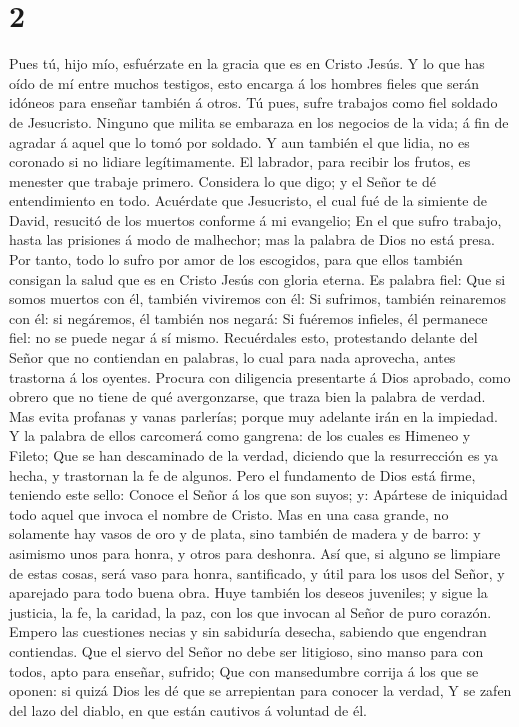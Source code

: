 \hypertarget{section-1}{%
\section{2}\label{section-1}}

 Pues tú, hijo mío, esfuérzate en la gracia que es en
Cristo Jesús.  Y lo que has oído de mí entre muchos
testigos, esto encarga á los hombres fieles que serán idóneos para
enseñar también á otros.  Tú pues, sufre trabajos como
fiel soldado de Jesucristo.  Ninguno que milita se
embaraza en los negocios de la vida; á fin de agradar á aquel que lo
tomó por soldado.  Y aun también el que lidia, no es
coronado si no lidiare legítimamente.  El labrador, para
recibir los frutos, es menester que trabaje primero. 
Considera lo que digo; y el Señor te dé entendimiento en todo.
 Acuérdate que Jesucristo, el cual fué de la simiente de
David, resucitó de los muertos conforme á mi evangelio; 
En el que sufro trabajo, hasta las prisiones á modo de malhechor; mas la
palabra de Dios no está presa.  Por tanto, todo lo sufro
por amor de los escogidos, para que ellos también consigan la salud que
es en Cristo Jesús con gloria eterna.  Es palabra fiel:
Que si somos muertos con él, también viviremos con él: 
Si sufrimos, también reinaremos con él: si negáremos, él también nos
negará:  Si fuéremos infieles, él permanece fiel: no se
puede negar á sí mismo.  Recuérdales esto, protestando
delante del Señor que no contiendan en palabras, lo cual para nada
aprovecha, antes trastorna á los oyentes.  Procura con
diligencia presentarte á Dios aprobado, como obrero que no tiene de qué
avergonzarse, que traza bien la palabra de verdad.  Mas
evita profanas y vanas parlerías; porque muy adelante irán en la
impiedad.  Y la palabra de ellos carcomerá como gangrena:
de los cuales es Himeneo y Fileto;  Que se han
descaminado de la verdad, diciendo que la resurrección es ya hecha, y
trastornan la fe de algunos.  Pero el fundamento de Dios
está firme, teniendo este sello: Conoce el Señor á los que son suyos; y:
Apártese de iniquidad todo aquel que invoca el nombre de Cristo.
 Mas en una casa grande, no solamente hay vasos de oro y
de plata, sino también de madera y de barro: y asimismo unos para honra,
y otros para deshonra.  Así que, si alguno se limpiare de
estas cosas, será vaso para honra, santificado, y útil para los usos del
Señor, y aparejado para todo buena obra.  Huye también
los deseos juveniles; y sigue la justicia, la fe, la caridad, la paz,
con los que invocan al Señor de puro corazón.  Empero las
cuestiones necias y sin sabiduría desecha, sabiendo que engendran
contiendas.  Que el siervo del Señor no debe ser
litigioso, sino manso para con todos, apto para enseñar, sufrido;
 Que con mansedumbre corrija á los que se oponen: si
quizá Dios les dé que se arrepientan para conocer la verdad,
 Y se zafen del lazo del diablo, en que están cautivos á
voluntad de él.

